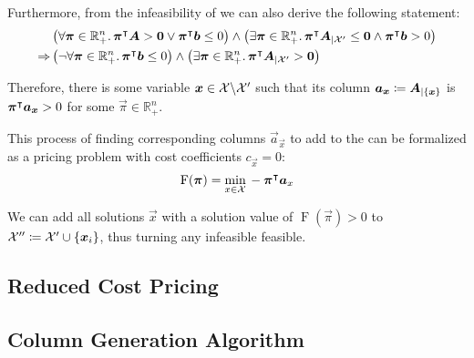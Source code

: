 Furthermore, from the infeasibility of \RMP{} we can also derive the following statement:
\begin{equation}
\begin{aligned}
& \left( \forall {\bm{\pi}} \in \mathbb{R}_+^n. \, {\bm{\pi}}^\intercal {\bm{A}} > {\bm{0}} \lor {\bm{\pi}}^\intercal {\bm{b}} \leq 0 \right) \land \left( \exists {\bm{\pi}} \in \mathbb{R}_+^n. \, {\bm{\pi}}^\intercal {\bm{A}}_{\vert \mathcal{X}'} \leq {\bm{0}} \land {\bm{\pi}}^\intercal {\bm{b}} > 0 \right) \\
\Rightarrow & \left( \neg \forall {\bm{\pi}} \in \mathbb{R}_+^n. \, {\bm{\pi}}^\intercal {\bm{b}} \leq 0 \right) \land \left( \exists {\bm{\pi}} \in \mathbb{R}_+^n. \, {\bm{\pi}}^\intercal {\bm{A}}_{\vert \mathcal{X}'} > {\bm{0}} \right)
\end{aligned}
\end{equation}

Therefore, there is some variable ${\bm{x}} \in \mathcal{X} \backslash \mathcal{X}'$ such that its column ${\bm{a}}_{\bm{x}} \coloneqq {\bm{A}}_{\vert \{{\bm{x}}\}}$ is ${\bm{\pi}}^\intercal {\bm{a}}_{\bm{x}} > 0$ for some $\vec{\pi} \in \mathbb{R}_+^n$.

This process of finding corresponding columns $\vec{a}_\vec{x}$ to add to the \RMP{} can be formalized as a pricing problem with cost coefficients $c_\vec{x} = 0$:
\begin{equation}
\operatorname{F}({\bm{\pi}}) = \underset{x \in \mathcal{X}}{\min} \, -{\bm{\pi}}^\intercal {\bm{a}}_x
\end{equation}

We can add all solutions $\vec{x}$ with a solution value of $\operatorname{F}(\vec{\pi}) > 0$ to $\mathcal{X}'' \coloneqq \mathcal{X}' \cup \{{\bm{x}}_i\}$, thus turning any infeasible \RMP{} feasible.

\subsection{Reduced Cost Pricing}\label{sec:cg_bp_cg_reduced}

\subsection{Column Generation Algorithm}\label{sec:cg_bp_cg_alg}

